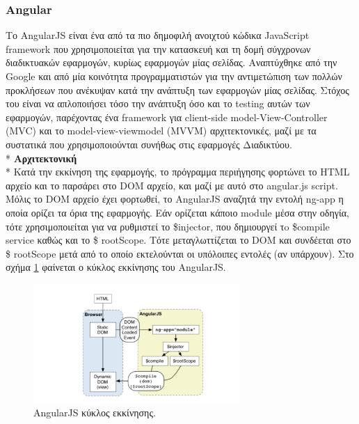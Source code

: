		\subsubsection{Angular}
		Το AngularJS είναι ένα από τα πιο δημοφιλή ανοιχτού κώδικα JavaScript framework που χρησιμοποιείται για την κατασκευή και τη δομή σύγχρονων διαδικτυακών εφαρμογών, κυρίως εφαρμογών μίας σελίδας. Αναπτύχθηκε από την Google και από μία κοινότητα προγραμματιστών για την αντιμετώπιση των πολλών προκλήσεων που ανέκυψαν κατά την ανάπτυξη των εφαρμογών μίας σελίδας.  Στόχος του είναι να απλοποιήσει τόσο την ανάπτυξη όσο και το testing αυτών των εφαρμογών, παρέχοντας ένα framework για client-side model-View-Controller (MVC) και το model-view-viewmodel (MVVM) αρχιτεκτονικές, μαζί με τα συστατικά που χρησιμοποιούνται συνήθως στις εφαρμογές Διαδικτύου.
	   \\*
			    \textbf{Αρχιτεκτονική}
	 \\*
		Κατά την εκκίνηση της εφαρμογής, το πρόγραμμα περιήγησης φορτώνει το HTML αρχείο και το παρσάρει στο DOM αρχείο, και μαζί με αυτό στο angular.js script. Μόλις το DOM αρχείο έχει φορτωθεί, το AngularJS αναζητά την εντολή ng-app η οποία ορίζει τα όρια της εφαρμογής. Εάν ορίζεται κάποιο module μέσα στην οδηγία, τότε χρησιμοποιείται για να ρυθμιστεί το \$injector, που δημιουργεί τo \$compile service καθώς και το \$ rootScope. Τότε μεταγλωττίζεται το DOM και συνδέεται στο \$ rootScope μετά από το οποίο εκτελούνται οι υπόλοιπες εντολές (αν υπάρχουν). Στο σχήμα \ref{fig:angularjs} φαίνεται ο κύκλος εκκίνησης του AngularJS.
		
	  \begin{figure}[h]
	    \centering
	    \includegraphics[width=0.7\textwidth]{angularjs.png}
	    \caption{AngularJS κύκλος εκκίνησης.}
	    \label{fig:angularjs}
	\end{figure}

